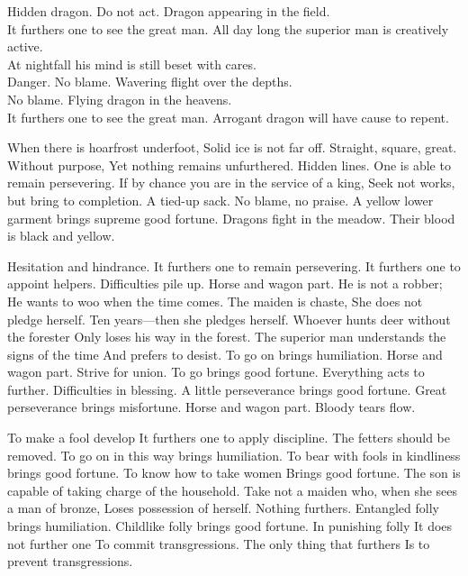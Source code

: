 {Hidden dragon. Do not act.}
{Dragon appearing in the field.\\
 It furthers one to see the great man.}
{All day long the superior man is creatively active.\\
 At nightfall his mind is still beset with cares.\\
 Danger. No blame.}
{Wavering flight over the depths.\\
 No blame.}
{Flying dragon in the heavens.\\
 It furthers one to see the great man.}
{Arrogant dragon will have cause to repent.}

{When there is hoarfrost underfoot,
 Solid ice is not far off.}
{Straight, square, great.
 Without purpose,
 Yet nothing remains unfurthered.}
{Hidden lines.
 One is able to remain persevering.
 If by chance you are in the service of a king,
 Seek not works, but bring to completion.}
{A tied-up sack. No blame, no praise.}
{A yellow lower garment brings supreme good fortune.}
{Dragons fight in the meadow.
 Their blood is black and yellow.}

{Hesitation and hindrance.
 It furthers one to remain persevering.
 It furthers one to appoint helpers.}
{Difficulties pile up.
 Horse and wagon part.
 He is not a robber;
 He wants to woo when the time comes.
 The maiden is chaste,
 She does not pledge herself.
 Ten years—then she pledges herself.}
{Whoever hunts deer without the forester
 Only loses his way in the forest.
 The superior man understands the signs of the time
 And prefers to desist.
 To go on brings humiliation.}
{Horse and wagon part.
 Strive for union.
 To go brings good fortune.
 Everything acts to further.}
{Difficulties in blessing.
 A little perseverance brings good fortune.
 Great perseverance brings misfortune.}
{Horse and wagon part.
 Bloody tears flow.}

{To make a fool develop
 It furthers one to apply discipline.
 The fetters should be removed.
 To go on in this way brings humiliation.}
{To bear with fools in kindliness brings good fortune.
 To know how to take women
 Brings good fortune.
 The son is capable of taking charge of the household.}
{Take not a maiden who, when she sees a man of bronze,
 Loses possession of herself.
 Nothing furthers.}
{Entangled folly brings humiliation.}
{Childlike folly brings good fortune.}
{In punishing folly
 It does not further one
 To commit transgressions.
 The only thing that furthers
 Is to prevent transgressions.}

